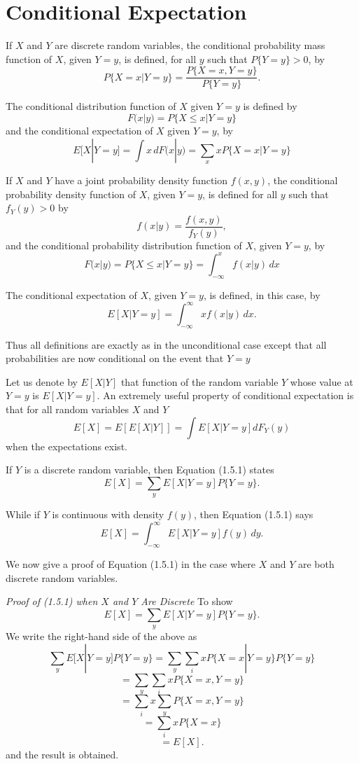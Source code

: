 \documentclass[lang=cn,10pt]{elegantbook}
\begin{document}
\section{Conditional Expectation}
If $X$ and $Y$ are discrete random variables, the conditional probability mass function of $X$, given $Y = y$, is defined, for all $y$ such that $P\{Y = y\} > 0$, by
\[
P\{X = x | Y = y\} = \frac{P\{X = x, Y = y\}}{P\{Y = y\}}.
\]

The conditional distribution function of $X$ given $Y = y$ is defined by
\[
F(x|y) = P\{X \leq x | Y = y\}
\]
and the conditional expectation of $X$ given $Y = y$, by
\[
E[X | Y = y] = \int x \, dF(x|y) = \sum_x x P\{X = x | Y = y\}
\]

If $X$ and $Y$ have a joint probability density function $f(x, y)$, the conditional probability density function of $X$, given $Y = y$, is defined for all $y$ such that $f_Y(y) > 0$ by
\[
f(x|y) = \frac{f(x, y)}{f_Y(y)},
\]
and the conditional probability distribution function of $X$, given $Y = y$, by
\[
F(x|y) = P\{X \leq x | Y = y\} = \int_{-\infty}^x f(x|y) \, dx
\]

The conditional expectation of $X$, given $Y = y$, is defined, in this case, by
\[
E[X | Y = y] = \int_{-\infty}^\infty x f(x|y) \, dx.
\]

Thus all definitions are exactly as in the unconditional case except that all probabilities are now conditional on the event that $Y = y$

Let us denote by $E[X | Y]$ that function of the random variable $Y$ whose value at $Y = y$ is $E[X | Y = y]$. An extremely useful property of conditional expectation is that for all random variables $X$ and $Y$
\begin{equation}
E[X] = E[E[X | Y]] = \int E[X | Y = y] dF_Y(y)
\end{equation}
when the expectations exist.

If $Y$ is a discrete random variable, then Equation (1.5.1) states
\[
E[X] = \sum_y E[X | Y = y] P\{Y = y\}.
\]

While if $Y$ is continuous with density $f(y)$, then Equation (1.5.1) says
\[
E[X] = \int_{-\infty}^\infty E[X | Y = y] f(y) \, dy.
\]

We now give a proof of Equation (1.5.1) in the case where $X$ and $Y$ are both discrete random variables.

\textit{Proof of (1.5.1) when $X$ and $Y$ Are Discrete} To show
\[
E[X] = \sum_y E[X | Y = y] P\{Y = y\}.
\]
We write the right-hand side of the above as
\[
\sum_y E[X | Y = y] P\{Y = y\} = \sum_y \sum_i x P\{X = x | Y = y\} P\{Y = y\}
\]
\[
= \sum_y \sum_i x P\{X = x, Y = y\}
\]
\[
= \sum_i x \sum_y P\{X = x, Y = y\}
\]
\[
= \sum_i x P\{X = x\}
\]
\[
= E[X].
\]
and the result is obtained.
\end{document}

